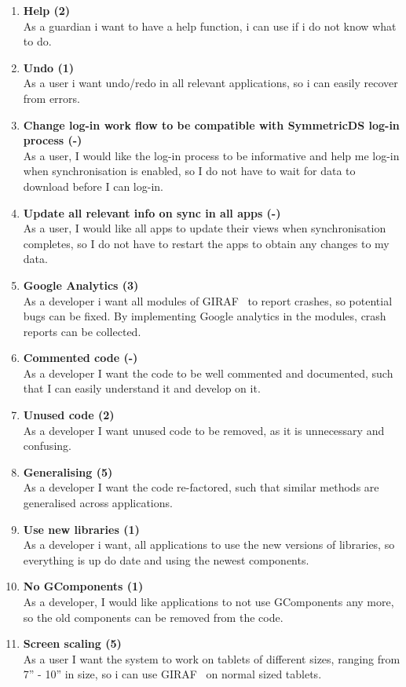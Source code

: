 \begin{enumerate}
	\item \textbf{Help (2)}\\
	As a guardian i want to have a help function, i can use if i do not know what to do.
	
	\item \textbf{Undo (1)}\\
	As a user i want undo/redo in all relevant applications, so i can easily recover from errors.
	
	\item \textbf{Change log-in work flow to be compatible with SymmetricDS log-in process (-)}\\
	As a user, I would like the log-in process to be informative and help me log-in when synchronisation is enabled, so I do not have to wait for data to download before I can log-in.
	
	\item \textbf{Update all relevant info on sync in all apps (-)}\\
	As a user, I would like all apps to update their views when synchronisation completes, so I do not have to restart the apps to obtain any changes to my data.
	
	\item \textbf{Google Analytics (3)}\\
	As a developer i want all modules of GIRAF~ to report crashes, so potential bugs can be fixed. By implementing Google analytics in the modules, crash reports can be collected.
	
	\item \textbf{Commented code (-)}\\
	As a developer I want the code to be well commented and documented, such that I can easily understand it and develop on it.
	
	\item \textbf{Unused code (2)}\\
	As a developer I want unused code to be removed, as it is unnecessary and confusing.
	
	\item \textbf{Generalising (5)}\\
	As a developer I want the code re-factored, such that similar methods are generalised across applications.
	
	\item \textbf{Use new libraries (1)}\\
	As a developer i want, all applications to use the new versions of libraries, so everything is up do date and using the newest components.
	
	\item \textbf{No GComponents (1)}\\
	As a developer, I would like applications to not use GComponents any more, so the old components can be removed from the code.
	
	\item \textbf{Screen scaling (5)}\\
	As a user I want the system to work on tablets of different sizes, ranging from 7” - 10” in size, so i can use GIRAF~ on normal sized tablets.
\end{enumerate}

